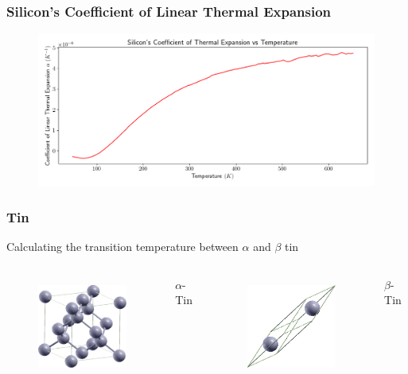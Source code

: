 \documentclass{beamer}
\begin{document}
\begin{frame}
	\frametitle{Silicon's Coefficient of Linear Thermal Expansion}
	\begin{figure}[ht]
	\begin{center}
		\includegraphics[height=2in]{silicon_thermal_expansion.png}
	\end{center}
	\end{figure}
\end{frame}

\begin{frame}
\frametitle{Tin}
\begin{center}Calculating the transition temperature between $\alpha$ and $\beta$ tin\end{center}
\begin{columns}
	\begin{figure}[ht]
	\begin{center}
		\includegraphics[height=1.3in]{alphasn.png}
	\end{center}
	\end{figure}
	\begin{center}
		$\alpha$-Tin
	\end{center}
	\begin{figure}[ht]
	\begin{center}
		\includegraphics[height=1.3in]{betasn.png}
	\end{center}
	\end{figure}
	\begin{center}
		$\beta$-Tin
	\end{center}
\end{columns}
\end{frame}
\end{document}
